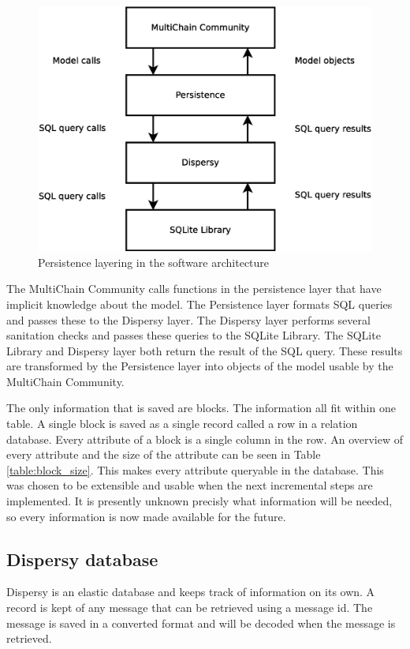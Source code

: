 \begin{figure}
	\centerline{\includegraphics[scale=0.3]{design/figs/persistence-layer.eps}}
	\caption{Persistence layering in the software architecture}
	\label{fig:persistence-layer}
\end{figure}

The MultiChain Community calls functions in the persistence layer that have implicit knowledge about the model.
The Persistence layer formats SQL queries and passes these to the Dispersy layer.
The Dispersy layer performs several sanitation checks and passes these queries to the SQLite Library.
The SQLite Library and Dispersy layer both return the result of the SQL query.
These results are transformed by the Persistence layer into objects of the model usable by the MultiChain Community.

The only information that is saved are blocks.
The information all fit within one table.
A single block is saved as a single record called a row in a relation database.
Every attribute of a block is a single column in the row.
An overview of every attribute and the size of the attribute can be seen in Table \ref{table:block_size}.
This makes every attribute queryable in the database.
This was chosen to be extensible and usable when the next incremental steps are implemented.
It is presently unknown precisly what information will be needed,
so every information is now made available for the future.

\subsection{Dispersy database}
Dispersy is an elastic database and keeps track of information on its own.
A record is kept of any message that can be retrieved using a message id.
The message is saved in a converted format and will be decoded when the message is retrieved.


